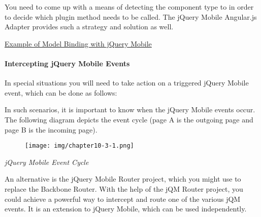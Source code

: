 \documentclass[9pt]{book}
\newenvironment{Shaded}{}{}
\newcommand{\KeywordTok}[1]{\textcolor[rgb]{0.00,0.44,0.13}{\textbf{{#1}}}}
\newcommand{\StringTok}[1]{\textcolor[rgb]{0.25,0.44,0.63}{{#1}}}
\newcommand{\CommentTok}[1]{\textcolor[rgb]{0.38,0.63,0.69}{\textit{{#1}}}}
\newcommand{\OtherTok}[1]{\textcolor[rgb]{0.00,0.44,0.13}{{#1}}}
\newcommand{\FunctionTok}[1]{\textcolor[rgb]{0.02,0.16,0.49}{{#1}}}
\newcommand{\NormalTok}[1]{{#1}}
\begin{document}
You need to come up with a means of detecting the component type to in
order to decide which plugin method needs to be called. The jQuery
Mobile Angular.js Adapter provides such a strategy and solution as well.

\href{https://github.com/tigbro/jquery-mobile-angular-adapter/blob/master/src/main/webapp/integration/jqmWidgetPatches.js}{Example
of Model Binding with jQuery Mobile}

\paragraph{Intercepting jQuery Mobile
Events}\label{intercepting-jquery-mobile-events}

In special situations you will need to take action on a triggered jQuery
Mobile event, which can be done as follows:

\begin{Shaded}
\end{Shaded}

In such scenarios, it is important to know when the jQuery Mobile events
occur. The following diagram depicts the event cycle (page A is the
outgoing page and page B is the incoming page).

\begin{figure}[htbp]
\centering
\texttt{[image: img/chapter10-3-1.png]}
\end{figure}

\emph{jQuery Mobile Event Cycle}

An alternative is the jQuery Mobile Router project, which you might use
to replace the Backbone Router. With the help of the jQM Router project,
you could achieve a powerful way to intercept and route one of the
various jQM events. It is an extension to jQuery Mobile, which can be
used independently.
\end{document}
